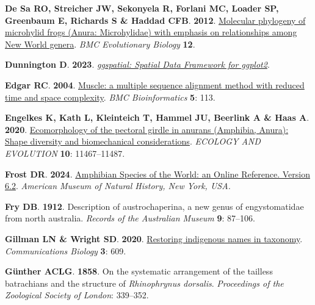 \documentclass[
  letterpaper,
  DIV=11,
  numbers=noendperiod]{scrartcl}
\newlength{\cslhangindent}
\newenvironment{CSLReferences}[2] %
 {\begin{list}{}{%
  \setlength{\itemindent}{0pt}
  \setlength{\leftmargin}{0pt}
  \setlength{\parsep}{0pt}
  \ifodd #1
   \setlength{\leftmargin}{\cslhangindent}
   \setlength{\itemindent}{-1\cslhangindent}
  \fi
  \setlength{\itemsep}{#2\baselineskip}}}
 {\end{list}}
\begin{document}
\begin{CSLReferences}{0}{1}
\textbf{\textbf{De Sa RO}, \textbf{Streicher JW}, \textbf{Sekonyela R},
\textbf{Forlani MC}, \textbf{Loader SP}, \textbf{Greenbaum E},
\textbf{Richards S} \& \textbf{Haddad CFB}}. \textbf{2012}.
\href{https://doi.org/\%7B10.1186/1471-2148-12-241\%7D}{{Molecular
phylogeny of microhylid frogs (Anura: Microhylidae) with emphasis on
relationships among New World genera}}. \emph{{BMC Evolutionary
Biology}} \textbf{{12}}.

\textbf{\textbf{Dunnington D}}. \textbf{2023}.
\emph{\href{https://CRAN.R-project.org/package=ggspatial}{{ggspatial:
Spatial Data Framework for ggplot2}}}.

\textbf{\textbf{Edgar RC}}. \textbf{2004}.
\href{https://doi.org/10.1186/1471-2105-5-113}{{Muscle: a multiple
sequence alignment method with reduced time and space complexity}}.
\emph{BMC Bioinformatics} \textbf{5}: 113.

\textbf{\textbf{Engelkes K}, \textbf{Kath L}, \textbf{Kleinteich T},
\textbf{Hammel JU}, \textbf{Beerlink A} \& \textbf{Haas A}}.
\textbf{2020}. \href{https://doi.org/10.1002/ece3.6784}{{Ecomorphology
of the pectoral girdle in anurans (Amphibia, Anura): Shape diversity and
biomechanical considerations}}. \emph{ECOLOGY AND EVOLUTION}
\textbf{10}: 11467--11487.

\textbf{\textbf{Frost DR}}. \textbf{2024}.
\href{https://doi.org/doi.org/10.5531/db.vz.0001}{{Amphibian Species of
the World: an Online Reference. Version 6.2}}. \emph{American Museum of
Natural History, New York, USA.}

\textbf{\textbf{Fry DB}}. \textbf{1912}. Description of austrochaperina,
a new genus of engystomatidae from north australia. \emph{Records of the
Australian Museum} \textbf{9}: 87--106.

\textbf{\textbf{Gillman LN} \& \textbf{Wright SD}}. \textbf{2020}.
\href{https://doi.org/10.1038/s42003-020-01344-y}{{Restoring indigenous
names in taxonomy}}. \emph{Communications Biology} \textbf{3}: 609.

\textbf{\textbf{Günther ACLG}}. \textbf{1858}. {On the systematic
arrangement of the tailless batrachians and the structure of
\emph{Rhinophrynus dorsalis}}. \emph{Proceedings of the Zoological
Society of London}: 339--352.


\end{CSLReferences}
\end{document}
